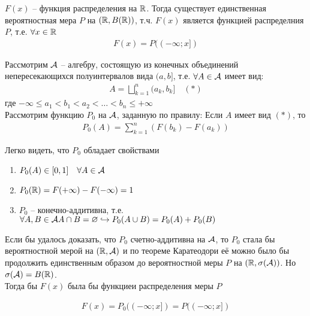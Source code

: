 \begin{theorem}
	$F(x)$ -- функция распределения на $\mathbb{R}$. 
	Тогда существует единственная вероятностная мера $P$ на $(\mathbb{R}, B(\mathbb{R}))$, т.ч. $F(x)$ 
	является функцией распределния $P$, т.е. $\forall x \in \mathbb{R}$
	\begin{align*}
		F(x) = P((-\infty; x])
	\end{align*}
\end{theorem}

Рассмотрим $\mathcal{A}$ -- алгебру, состоящую из конечных объединений непересекающихся полуинтервалов вида $(a, b]$, т.е. $\forall A \in \mathcal{A}$ имеет вид:
\begin{align*}
	A = \bigsqcup_{k = 1}^{n} (a_k, b_k] \quad (*)
\end{align*}
где $-\infty \leq a_1 < b_1 < a_2 < \ldots < b_n \leq +\infty$\\

Рассмотрим функцию $P_0$ на $\mathcal{A}$, заданную по правилу: Если $A$ имеет вид $(*)$, то
\begin{align*}
	P_0 (A) = \sum_{k = 1}^{n} (F(b_k) - F(a_k))
\end{align*}

Легко видеть, что $P_0$ обладает свойствами 
\begin{enumerate}
	\item $P_0(A) \in [0, 1]\quad \forall A \in \mathcal{A}$
	\item $P_0(\mathbb{R}) = F(+\infty) - F(-\infty) = 1$
	\item 
		$P_0$ -- конечно-аддитивна, т.е. 
		$\forall A, B \in \mathcal{A}\\
		 A \cap B = \varnothing \hookrightarrow P_0 (A \cup B) = P_0(A) + P_0(B)$
\end{enumerate}

Если бы удалось доказать, что $P_0$  счетно-аддитивна на $\mathcal{A}$, 
то $P_0$ стала бы вероятностной мерой на $(\mathbb{R}, \mathcal{A})$ и по теореме Каратеодори
 её можно было бы продолжить единственным образом до вероятностной меры $P$ 
 на $(\mathbb{R}, \sigma(\mathcal{A}))$. Но $\sigma(\mathcal{A}) = B(\mathbb{R})$.\\

Тогда бы $F(x)$ была бы функциеи распределения меры $P$

\begin{align*}
	F(x) = P_0 ((-\infty; x]) = P((-\infty; x])
\end{align*}


